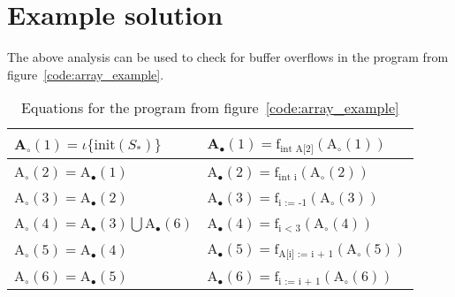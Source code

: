 \section{Example solution}
The above analysis can be used to check for buffer overflows in the program from figure~\ref{code:array_example}.
\begin{table}[H]
\begin{tabular}{| l | l |}
\hline
A$_\circ (1) = \iota \{\text{init}(S_*) \} $ & A$_\bullet(1) = \text{f}_{\text{int A[2]}} (\text{A}_\circ (1))$ \\
\hline
A$_\circ (2) =$A$_\bullet(1) $ & A$_\bullet(2) = \text{f}_{\text{int i}} (\text{A}_\circ (2))$ \\
\hline
A$_\circ (3) = $A$_\bullet(2)$ & A$_\bullet(3) = \text{f}_{\text{i := -1}} (\text{A}_\circ (3))$  \\
\hline
A$_\circ (4) = $A$_\bullet(3) \bigcup $A$_\bullet(6) $ & A$_\bullet(4) = \text{f}_{\text{i < 3}} (\text{A}_\circ (4))$ \\
\hline
A$_\circ (5) = $A$_\bullet(4)$ & A$_\bullet(5) = \text{f}_{\text{A[i] := i + 1}} (\text{A}_\circ (5))$ \\
\hline
A$_\circ (6) = $A$_\bullet(5)$ & A$_\bullet(6) = \text{f}_{\text{i := i + 1}} (\text{A}_\circ (6))$ \\

\hline
\end{tabular}
\centering
\caption{Equations for the program from figure~\ref{code:array_example}}
\label{table:}
\end{table}

